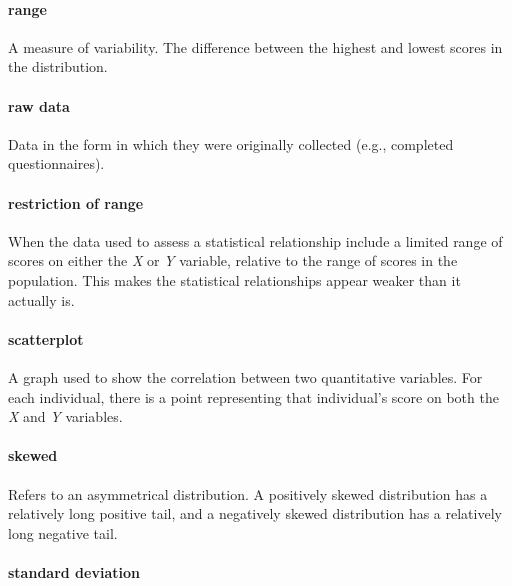 \documentclass[
]{krantz}
\begin{document}
\paragraph*{range}\label{range}

A measure of variability. The difference between the highest and lowest scores in the distribution.

\paragraph*{raw data}\label{raw-data}

Data in the form in which they were originally collected (e.g., completed questionnaires).

\paragraph*{restriction of range}\label{restriction-of-range}

When the data used to assess a statistical relationship include a limited range of scores on either the \emph{X} or \emph{Y} variable, relative to the range of scores in the population. This makes the statistical relationships appear weaker than it actually is.

\paragraph*{scatterplot}\label{scatterplot-1}

A graph used to show the correlation between two quantitative variables. For each individual, there is a point representing that individual's score on both the \emph{X} and \emph{Y} variables.

\paragraph*{skewed}\label{skewed}

Refers to an asymmetrical distribution. A positively skewed distribution has a relatively long positive tail, and a negatively skewed distribution has a relatively long negative tail.

\paragraph*{standard deviation}\label{standard-deviation}
\end{document}
